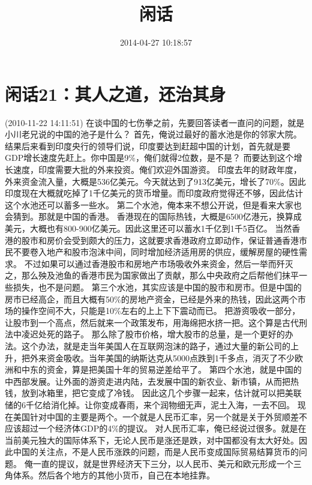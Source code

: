 \documentclass[11pt]{article}
\date{2014-04-27 10:18:57}
\title{闲话}
\begin{document}
\maketitle
\tableofcontents



\section{闲话21：其人之道，还治其身}
\label{sec-1}
(2010-11-22 14:11:51)
在谈中国的七伤拳之前，先要回答读者一直问的问题，就是小川老兄说的中国的池子是什么？
首先，俺说过最好的蓄水池是你的邻家大院。结果后来看到印度央行的领导们说，印度要达到赶超中国的计划，首先就是要GDP增长速度先赶上。你中国是9\%，俺们就得2位数，是不是？
而要达到这个增长速度，印度需要大批的外来投资。俺们欢迎外国游资。
印度去年的财政年度，外来资金流入量，大概是536亿美元。今天就达到了913亿美元，增长了70\%。因此印度现在大概就吃掉了1千亿美元的货币增量。而印度政府觉得还不够，因此估计这个水池还可以蓄多一些水。
第二个水池，俺本来不想公开说，但是看来大家也会猜到。那就是中国的香港。
香港现在的国际热钱，大概是6500亿港元，换算成美元，大概也有800-900亿美元。因此这里还可以蓄水1千亿到1千5百亿。
当然香港的股市和房价会受到颇大的压力，这就要求香港政府立即动作，保证普通香港市民不要卷入地产和股市泡沫中间，同时增加经济适用房的供应，缓解房屋的硬性需求。
不过如果可以通过香港股市和房地产市场吸收外来资金，然后一举而歼灭之，那么殃及池鱼的香港市民为国家做出了贡献，那么中央政府之后帮他们抹平一些损失，也不是问题。
第三个水池，其实应该是中国的股市和房市。但是中国的房市已经高企，而且大概有50\%的房地产资金，已经是外来的热钱，因此这两个市场的操作空间不大，只能是10\%左右的上上下下震动而已。
把游资吸收一部分，让股市到一个高点，然后就来一个政策发布，用海绵把水挤一把。这个算是古代刑法中凌迟处死的路子。
那么除了股市价格，增大股市的总量，是一个更好的办法。这个办法，就是走当年美国人在互联网泡沫的路子，通过大量的新公司的上升，把外来资金吸收。当年美国的纳斯达克从5000点跌到1千多点，消灭了不少欧洲和中东的资金，算是把美国十年的贸易逆差给平了。
第四个水池，就是中国的中西部发展。让外面的游资走进内陆，去发展中国的新农业、新市镇，从而把热钱，放到冰箱里，把它变成了冷钱。
因此这几个步骤一起来，估计就可以把美联储的6千亿给消化掉。让你变成春雨，来个润物细无声，泥土入海，一去不回。
现在美国针对中国的主要是两个。一个就是人民币汇率，另一个就是关于外贸顺差不应该超过一个经济体GDP的4\%的提议。
对人民币汇率，俺已经说过很多。就是在当前美元独大的国际体系下，无论人民币是涨还是跌，对中国都没有太大好处。因此中国的关注点，不是人民币涨跌的问题，而是人民币变成国际贸易结算货币的问题。
俺一直的提议，就是世界经济天下三分，以人民币、美元和欧元形成一个三角体系。然后各个地方的其他小货币，自己在本地挂靠。
\end{document}
